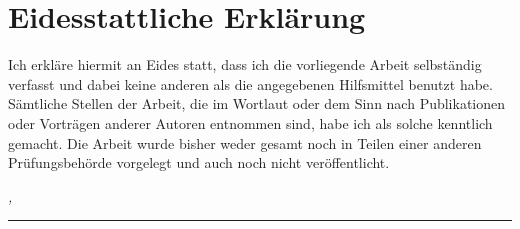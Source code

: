%
\chapter*{Eidesstattliche Erklärung}
\label{sec:declaration}
\thispagestyle{empty}

Ich erkläre hiermit an Eides statt, dass ich die vorliegende Arbeit selbständig verfasst und dabei keine anderen als die angegebenen Hilfsmittel benutzt habe. Sämtliche Stellen der Arbeit, die im Wortlaut oder dem Sinn nach Publikationen oder Vorträgen anderer Autoren entnommen sind, habe ich als solche kenntlich gemacht. Die Arbeit wurde bisher weder gesamt noch in Teilen einer anderen Prüfungsbehörde vorgelegt und auch noch nicht veröffentlicht. 

\bigskip

\noindent\textit{\thesisUniversityCity, \thesisDate}

\smallskip

\begin{flushright}
	\begin{minipage}{5cm}
		\rule{\textwidth}{1pt}
		\centering\thesisName
	\end{minipage}
\end{flushright}

